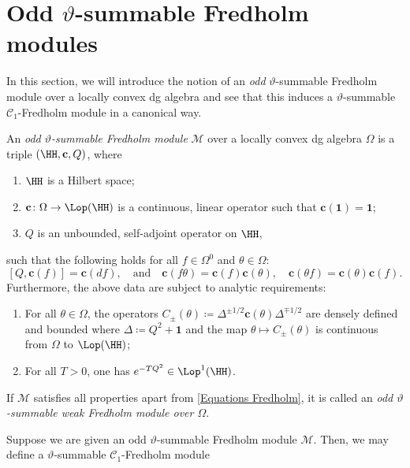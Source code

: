 \documentclass[a4paper, english, 12pt, bibliography=totocnumbered,
index=totoc]{scrartcl}
\begin{document}
\section{Odd \texorpdfstring{$\vartheta$}{ϑ}-summable Fredholm
	modules}\label{Section: odd FM}
In this section, we will introduce the notion of an \textit{odd}
$\vartheta$-summable Fredholm module over a locally convex dg algebra and see
that this induces a $\vartheta$-summable $\mathcal{C}_1$-Fredholm module in a
canonical way.
\begin{defn}\label{Definition odd FM}
	An \textit{odd $\vartheta$-summable Fredholm module} $\mathscr{M}$ over a
	locally convex dg algebra $\Omega$ is
	a triple $(\HH, \mathbf{c}, Q)$, where
	\begin{enumerate}
		\item $\HH$ is a Hilbert space;
		\item $\mathbf{c} \colon \Omega \to \Lop(\HH)$ is a continuous, linear
		operator such that $\mathbf{c}(\mathbf{1}) = \mathbf{1}$;
		\item $Q$ is an unbounded, self-adjoint operator on $\HH$,
	\end{enumerate}
	such that the following holds for all $f \in \Omega^0$ and $\theta \in
	\Omega$:
	\begin{equation}\label{Equations Fredholm}
		[Q, \mathbf{c}(f)] = \mathbf{c}(df), \quad \text{and} \quad
		\mathbf{c}(f \theta) =
		\mathbf{c}(f) \mathbf{c}(\theta), \quad \mathbf{c}(\theta f) =
		\mathbf{c}(\theta) \mathbf{c}(f).
	\end{equation}
	Furthermore, the above data are subject to analytic requirements:
	\begin{enumerate}[label=(A{{\arabic*}})]
		\item For all $\theta \in \Omega$, the operators $C_{\pm}(\theta)
		\coloneqq \Delta^{\pm 1/2} \mathbf{c}(\theta) \Delta^{\mp 1/2}$ are
		densely defined and bounded where $\Delta \coloneqq Q^2 + \mathbf{1}$
		and the map $\theta \mapsto C_{\pm}(\theta)$ is continuous from
		$\Omega$ to $\Lop(\HH)$;
		\item For all $T > 0$, one has $e^{-TQ^2} \in \Lop^1(\HH)$.
	\end{enumerate}
	If $\mathscr{M}$ satisfies all properties apart from \cref{Equations
	Fredholm}, it is called an \textit{odd $\vartheta$-summable weak Fredholm
	module over $\Omega$}.
\end{defn}
Suppose we are given an odd $\vartheta$-summable Fredholm module
$\mathscr{M}$.
Then, we may define a $\vartheta$-summable $\mathcal{C}_1$-Fredholm module
\end{document}
